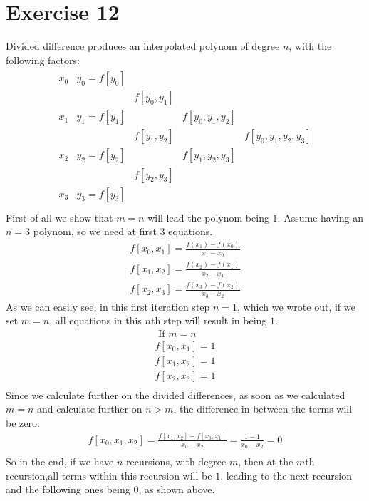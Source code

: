 \section{Exercise 12}
Divided difference produces an interpolated polynom of degree $n$, with the following factors:
\begin{gather*}
\begin{matrix}
x_0 & y_0 = f[y_0] &           &               & \\
        &       & f[y_0,y_1] &               & \\
x_1 & y_1 = f[y_1] &           & f[y_0,y_1,y_2] & \\
        &       & f[y_1,y_2] &               & f[y_0,y_1,y_2,y_3]\\
x_2 & y_2 = f[y_2] &           & f[y_1,y_2,y_3] & \\
        &       & f[y_2,y_3] &               & \\
x_3 & y_3 = f[y_3] &           &               & \\
\end{matrix}
\end{gather*}
First of all we show that $m=n$ will lead the polynom being $1$. Assume having an $n = 3$ polynom, so we need at first 3 equations.
\begin{gather*}
f [ x_0 ,x_1 ] = \frac{f(x_1) - f(x_0)}{x_1 - x_0} \\
f [ x_1 ,x_2 ] = \frac{f(x_2) - f(x_1)}{x_2 - x_1}\\
f [ x_2 ,x_3 ] = \frac{f(x_3) - f(x_2)}{x_3 - x_2}
\end{gather*}
As we can easily see, in this first iteration step $n=1$, which we wrote out, if we set $m=n$, all equations in this $n$th step will result in being $1$.
\begin{gather*}
\text{ If } m = n \\
f [ x_0 ,x_1 ] = 1 \\
f [ x_1 ,x_2 ] = 1 \\
f [ x_2 ,x_3 ] = 1\\
\end{gather*}
Since we calculate further on the divided differences, as soon as we calculated $m=n$ and calculate further on $n > m$, the difference in between the terms will be zero:
\begin{gather*}
f [ x_0,x_1,x_2 ] = \frac{f[ x_1,x_2] - f[x_0 ,x_1]}{x_0 - x_2} = \frac{1 - 1}{x_0 -x_2} = 0\\
\end{gather*}
So in the end, if we have $n$ recursions, with degree $m$, then at the $m$th recursion,all terms within this recursion will be $1$, leading to the next recursion and the following ones being $0$, as shown above.

